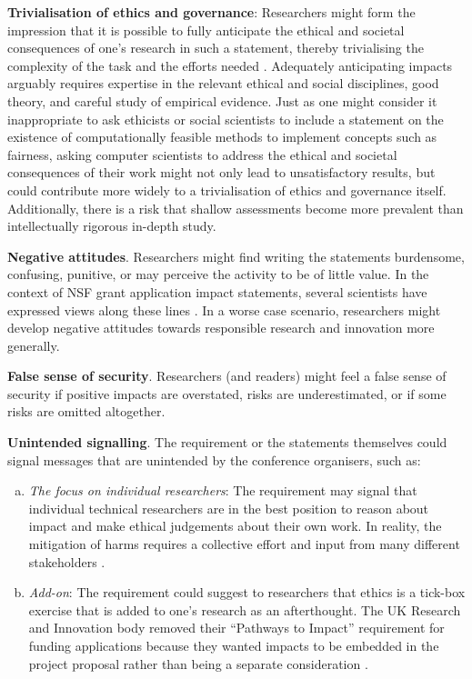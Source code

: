 \documentclass[11pt,english]{article}
\begin{document}
	\textbf{Trivialisation of ethics and governance}:  Researchers might form the impression that it is possible to fully anticipate the ethical and societal consequences of one's research in such a statement, thereby trivialising the complexity of the task and the efforts needed \citep{holbrook_peer_2011,european_commission_assessing_2005,spaapen_introducing_2011}. Adequately anticipating impacts arguably requires expertise in the relevant ethical and social disciplines, good theory, and careful study of empirical evidence. Just as one might consider it inappropriate to ask ethicists or social scientists to include a statement on the existence of computationally feasible methods to implement concepts such as fairness, asking computer scientists to address the ethical and societal consequences of their work might not only lead to unsatisfactory results, but could contribute more widely to a trivialisation of ethics and governance itself. Additionally, there is a risk that shallow assessments become more prevalent than intellectually rigorous in-depth study. 
	
	\textbf{Negative attitudes}. Researchers might find writing the statements burdensome, confusing, punitive, or may perceive the activity to be of little value. In the context of NSF grant application impact statements, several scientists have expressed views along these lines \citep{tretkoff_nsfs_2007}. In a worse case scenario, researchers might develop negative attitudes towards responsible research and innovation more generally.
	
	\textbf{False sense of security}. Researchers (and readers) might feel a false sense of security if positive impacts are overstated, risks are underestimated, or if some risks are omitted altogether.
	
	\textbf{Unintended signalling}. The requirement or the statements themselves could signal messages that are unintended by the conference organisers, such as:
	\begin{enumerate}[(a)]
		\item \textit{The focus on individual researchers}: The requirement may signal that individual technical researchers are in the best position to reason about impact and make ethical judgements about their own work. In reality, the mitigation of harms requires a collective effort and input from many different stakeholders \citep{kenneally_cyber-security_2014}.
		\item \textit{Add-on}: The requirement could suggest to researchers that ethics is a tick-box exercise that is added to one's research as an afterthought. The UK Research and Innovation body removed their ``Pathways to Impact'' requirement for funding applications because they wanted impacts to be embedded in the project proposal rather than being a separate consideration \citep{uk_research_and_innovation_pathways_2020}.
	\end{enumerate}
	
\end{document}
